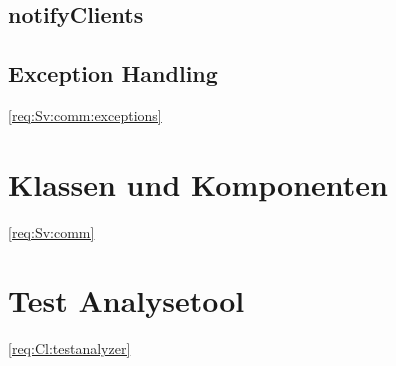 \subsection {notifyClients}

\subsection {Exception Handling}
\ref{req:Sv:comm:exceptions}
\section{Klassen und Komponenten}
\ref{req:Sv:comm}
\section{Test Analysetool} \ref{req:Cl:testanalyzer}
